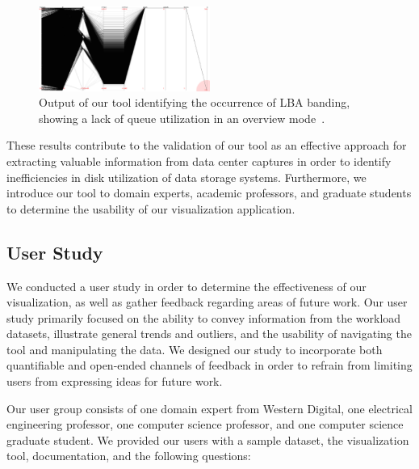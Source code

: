 \documentclass[journal]{vgtc}                %
\begin{document}
\begin{figure}[h!!]
 \centering
 \includegraphics[width=0.5\textwidth]{images/no_queue.eps}
 \caption[Output of our tool identifying the occurrence of LBA banding.]{Output of our tool identifying the occurrence of LBA banding, showing a lack of queue utilization in an overview mode~\cite{internal:collab}.}
 \label{fig:no_queue}
\end{figure}

These results contribute to the validation of our tool as an effective approach for extracting valuable information from data center captures in order to identify inefficiencies in disk utilization of data storage systems. Furthermore, we introduce our tool to domain experts, academic professors, and graduate students to determine the usability of our visualization application.

\subsection{User Study}
We conducted a user study in order to determine the effectiveness of our visualization, as well as gather feedback regarding areas of future work. Our user study primarily focused on the ability to convey information from the workload datasets, illustrate general trends and outliers, and the usability of navigating the tool and manipulating the data. We designed our study to incorporate both quantifiable and open-ended channels of feedback in order to refrain from limiting users from expressing ideas for future work.

Our user group consists of one domain expert from Western Digital, one electrical engineering professor, one computer science professor, and one computer science graduate student. We provided our users with a sample dataset, the visualization tool, documentation, and the following questions:
\end{document}
